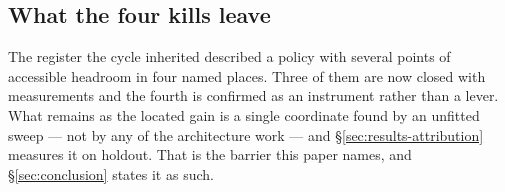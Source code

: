 \subsection{What the four kills leave}
\label{sec:rejected-leaves}

The register the cycle inherited described a policy with several points of accessible headroom in
four named places. Three of them are now closed with measurements and the fourth is confirmed as an
instrument rather than a lever. What remains as the located gain is a single coordinate found by an
unfitted sweep --- not by any of the architecture work --- and \S\ref{sec:results-attribution}
measures it on holdout. That is the barrier this paper names, and \S\ref{sec:conclusion} states it
as such.
